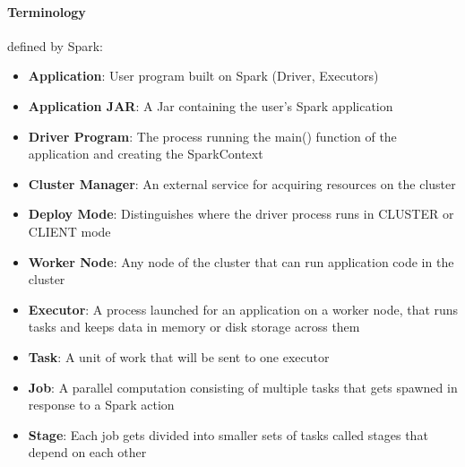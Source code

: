 \documentclass[12pt]{article}
\begin{document}
\paragraph{Terminology} defined by Spark:
\begin{itemize}
  \item \textbf{Application}: User program built on Spark (Driver, Executors)
  \item \textbf{Application JAR}: A Jar containing the user's Spark application
  \item \textbf{Driver Program}: The process running the main() function of the application and creating the SparkContext
  \item \textbf{Cluster Manager}: An external service for acquiring resources on the cluster
  \item \textbf{Deploy Mode}: Distinguishes where the driver process runs in CLUSTER or CLIENT mode
  \item \textbf{Worker Node}: Any node of the cluster that can run application code in the cluster
  \item \textbf{Executor}: A process launched for an application on a worker node, that runs tasks and keeps data in memory or disk storage across them
  \item \textbf{Task}: A unit of work that will be sent to one executor
  \item \textbf{Job}: A parallel computation consisting of multiple tasks that gets spawned in response to a Spark action
  \item \textbf{Stage}: Each job gets divided into smaller sets of tasks called stages that depend on each other
\end{itemize}
\end{document}
